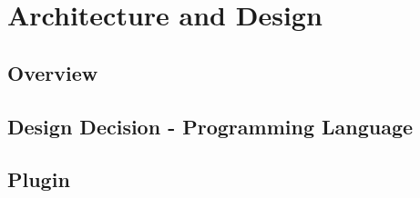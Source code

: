\chapter{Architecture and Design}
\section{Overview}
\lipsum[2-4]

\section{Design Decision - Programming Language}
\lipsum[5-7]
\section{Plugin}
\lipsum[8-9]

